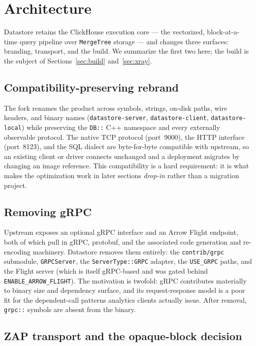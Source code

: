 \section{Architecture}
\label{sec:arch}

Datastore retains the ClickHouse execution core --- the vectorized,
block-at-a-time query pipeline over \texttt{MergeTree} storage --- and changes
three surfaces: branding, transport, and the build. We summarize the first two
here; the build is the subject of Sections~\ref{sec:build} and~\ref{sec:xray}.

\subsection{Compatibility-preserving rebrand}

The fork renames the product across symbols, strings, on-disk paths, wire
headers, and binary names (\texttt{datastore-server}, \texttt{datastore-client},
\texttt{datastore-local}) while preserving the \texttt{DB::} C++ namespace and
every externally observable protocol. The native TCP protocol (port~9000), the
HTTP interface (port~8123), and the SQL dialect are byte-for-byte compatible
with upstream, so an existing client or driver connects unchanged and a
deployment migrates by changing an image reference. This compatibility is a
hard requirement: it is what makes the optimization work in later sections
\emph{drop-in} rather than a migration project.

\subsection{Removing gRPC}

Upstream exposes an optional gRPC interface and an Arrow Flight endpoint, both
of which pull in gRPC, protobuf, and the associated code generation and
re-encoding machinery. Datastore removes them entirely: the \texttt{contrib/grpc}
submodule, \texttt{GRPCServer}, the \texttt{ServerType::GRPC} adapter, the
\texttt{USE\_GRPC} paths, and the Flight server (which is itself gRPC-based and
was gated behind \texttt{ENABLE\_ARROW\_FLIGHT}). The motivation is twofold:
gRPC contributes materially to binary size and dependency surface, and its
request-response model is a poor fit for the dependent-call patterns analytics
clients actually issue. After removal, \texttt{grpc::} symbols are absent from
the binary.

\subsection{ZAP transport and the opaque-block decision}

